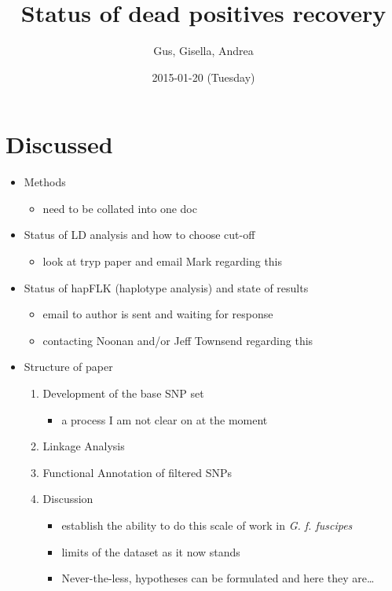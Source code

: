 \documentclass[letterpaper]{scrartcl}
\title{Status of dead positives recovery\\\vspace{0.5em}{\large Meeting notes}}
\author{Gus, Gisella, Andrea}
\date{2015-01-20 (Tuesday)}
\begin{document}
\maketitle

{
\hypersetup{linkcolor=black}
\setcounter{tocdepth}{3}
\tableofcontents
}
\section{Discussed}\label{discussed}

\begin{itemize}
\itemsep1pt\parskip0pt
\item
  Methods

  \begin{itemize}
  \itemsep1pt\parskip0pt
  \item
    need to be collated into one doc
  \end{itemize}
\item
  Status of LD analysis and how to choose cut-off

  \begin{itemize}
  \itemsep1pt\parskip0pt
  \item
    look at tryp paper and email Mark regarding this
  \end{itemize}
\item
  Status of hapFLK (haplotype analysis) and state of results

  \begin{itemize}
  \itemsep1pt\parskip0pt
  \item
    email to author is sent and waiting for response
  \item
    contacting Noonan and/or Jeff Townsend regarding this
  \end{itemize}
\item
  Structure of paper

  \begin{enumerate}
  \def\labelenumi{\arabic{enumi}.}
  \itemsep1pt\parskip0pt
  \item
    Development of the base SNP set

    \begin{itemize}
    \itemsep1pt\parskip0pt
    \item
      a process I am not clear on at the moment
    \end{itemize}
  \item
    Linkage Analysis
  \item
    Functional Annotation of filtered SNPs
  \item
    Discussion

    \begin{itemize}
    \itemsep1pt\parskip0pt
    \item
      establish the ability to do this scale of work in \emph{G. f.
      fuscipes}
    \item
      limits of the dataset as it now stands
    \item
      Never-the-less, hypotheses can be formulated and here they
      are\ldots{}
    \end{itemize}
  \end{enumerate}
\end{itemize}
\end{document}
